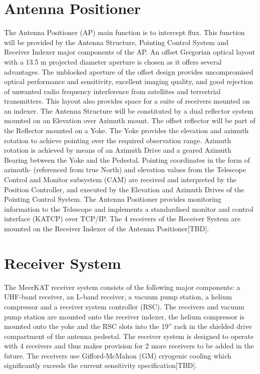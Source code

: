 \section{Antenna Positioner}

The Antenna Positioner (AP)\cite{AP} main function is to intercept flux. This function will be provided by the Antenna Structure, Pointing Control System and Receiver Indexer major components of the AP. An offset Gregorian optical layout with a 13.5 m projected diameter aperture is chosen as it offers several advantages. The unblocked aperture of the offset design provides uncompromised optical performance and sensitivity, excellent imaging quality, and good rejection of unwanted radio frequency interference from satellites and terrestrial transmitters. This layout also provides space for a suite of receivers mounted on an indexer.
The Antenna Structure will be constituted by a dual reflector system mounted on an Elevation over Azimuth mount. The offset reflector will be part of the Reflector mounted on a Yoke. The Yoke provides the elevation and azimuth rotation to achieve pointing over the required observation range. Azimuth rotation is achieved by means of an Azimuth Drive and a geared Azimuth Bearing between the Yoke and the Pedestal. Pointing coordinates in the form of azimuth- (referenced from true North) and elevation values from the Telescope Control and Monitor subsystem (CAM) are received and interpreted by the Position
Controller, and executed by the Elevation and Azimuth Drives of the Pointing Control System. The Antenna Positioner provides monitoring information to the Telescope and implements a standardised monitor and control interface (KATCP) over TCP/IP.
The 4 receivers of the Receiver System are mounted on the Receiver Indexer of the Antenna Positioner[TBD].

\section{Receiver System}
The MeerKAT receiver system\cite{RSC} consists of the following major components: a UHF-band receiver, an L-band receiver, a vacuum pump station, a helium compressor and a receiver system controller (RSC). The receivers and vacuum pump station are mounted onto the receiver indexer, the helium compressor is mounted onto the yoke and the RSC slots into the 19” rack in the shielded drive compartment of the antenna pedestal. The receiver system is designed to operate with 4 receivers and thus makes provision for 2 more receivers
to be added in the future. The receivers use Gifford-McMahon (GM) cryogenic cooling which significantly exceeds the current sensitivity specification[TBD].
